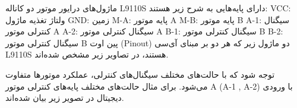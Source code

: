 				
								
				
ماژول‌های درایور موتور دو کاناله L9110S دارای پایه‌هایی به شرح زیر هستند:
VCC: ولتاژ تغذیه ماژول
GND: زمین
M-A: پایه موتور A
M-B: پایه موتور B
A-1: سیگنال کنترلی موتور A
A-2: سیگنال کنترلی موتور A
B-1: سیگنال کنترلی موتور B
B-2: سیگنال کنترلی موتور B
پین اوت (Pinout) دو ماژول زیر که هر دو بر مبنای آی‌سی L9110S هستند، در تصاویر زیر مشخص شده‌اند.
					
						
				
			توجه شود که با حالت‌های مختلف سیگنال‌های کنترلی، عملکرد موتورها متفاوت می‌شود. برای مثال حالت‌های مختلف پایه‌های کنترلی موتور A (A-1 , A-2) با ورودی دیجیتال در تصویر زیر بیان شده‌اند.
		
				



